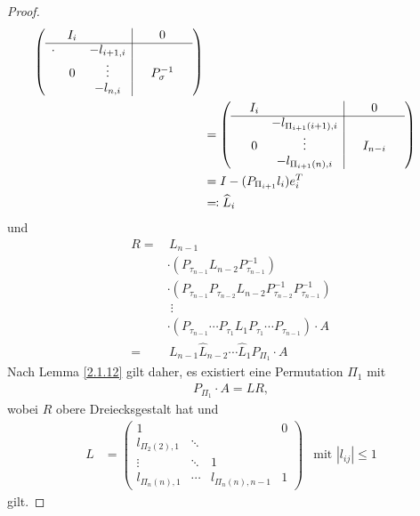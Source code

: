 \documentclass[ngerman,fontsize=11pt, paper=a4, parskip=half, titlepage=true, toc=bib]{scrbook}
\begin{document}
\begin{proof}
\begin{align*}
            \left(\begin{array}{ccc|ccc}
                     & I_i & && 0 & \\
                     \cline{1-6}
                     \cdot & & -l_{i+1, i} & & & \\
                     &  0 &  \vdots      & & P_{\sigma}^{-1} &\\
                     &     & -l_{n, i} & &  & 
                  \end{array}\right) \\
         &= \left(\begin{array}{ccc|ccc}
                    & I_i & && 0 & \\
                    \cline{1-6}
                    &     & -l_{\Pi_{i+1}(i+1), i} & & & \\
                    &  0 &  \vdots      & & I_{n-i} &\\
                    &     & -l_{\Pi_{i+1}(n), i} & &  & 
                  \end{array}\right) \\
         &= I - (P_{\Pi_{i+1}} l_i)e_i^T\\
         &\eqqcolon \widehat{L}_i
  \end{align*}
  und
  \begin{align*}		R =&\, L_{n-1}\\
                                   &\cdot (P_{\tau_{n-1}}L_{n-2}P_{\tau_{n-1}}^{-1})\\
                                   &				\cdot (P_{\tau_{n-1}}P_{\tau_{n-2}}L_{n-2}P_{\tau_{n-2}}^{-1}P_{\tau_{n-1}}^{-1})\\
                                   &\; \vdots \\
                                   &		 \cdot (P_{\tau_{n-1}}\dotsm P_{\tau_{1}}L_{1}P_{\tau_{1}}\dotsm P_{\tau_{n-1}}) \cdot A\\
    =&\,L_{n-1}\widehat{L}_{n-2}\dotsm\widehat{L}_1P_{\Pi_{1}}\cdot A
  \end{align*}
  Nach Lemma \ref{2.1.12} gilt daher, es existiert eine Permutation $\Pi_{1}$ mit
  \begin{gather*}
    P_{\Pi_1}\cdot A = LR ,
  \end{gather*}
  wobei $R$ obere Dreiecksgestalt hat und
  \begin{align*}
    L  &=  \begin{pmatrix}
      1 && & 0\\
      l_{\Pi_2(2),1} & \ddots & \\
      \vdots &            \ddots &  1\\
      l_{\Pi_n(n),1}& \dotsm &  l_{\Pi_n(n),n-1} & 1 
    \end{pmatrix} 
                     & \text{mit } |l_{ij}| \leq 1 
  \end{align*}
  gilt.
\end{proof}
\end{document}
